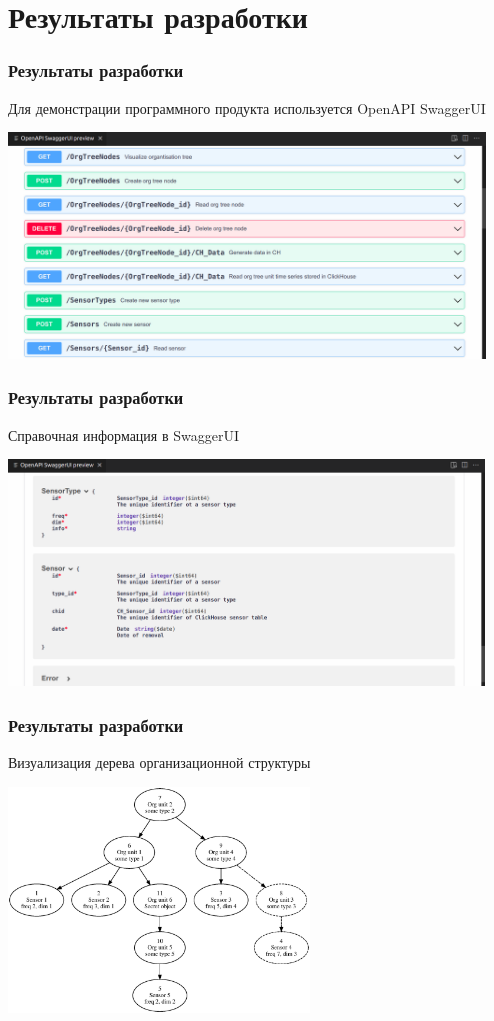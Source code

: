\documentclass[pdf, hyperref={unicode}, aspectratio=169]{beamer}
\begin{document}
\section{Результаты разработки}
\begin{frame}
	\frametitle{Результаты разработки}
	
	Для демонстрации программного продукта используется OpenAPI SwaggerUI
	
	\begin{center}
		\includegraphics[height = 6cm]{swagger1.png}
	\end{center}
\end{frame}


\begin{frame}
	\frametitle{Результаты разработки}
	
	Справочная информация в SwaggerUI
	
	\begin{center}
		\includegraphics[height = 6cm]{swagger2.png}
	\end{center}
\end{frame}


\begin{frame}
	\frametitle{Результаты разработки}
	
	Визуализация дерева организационной структуры
	
	\begin{center}
		\includegraphics[height = 6cm]{demo_del8.eps}
	\end{center}
\end{frame}
\end{document}
